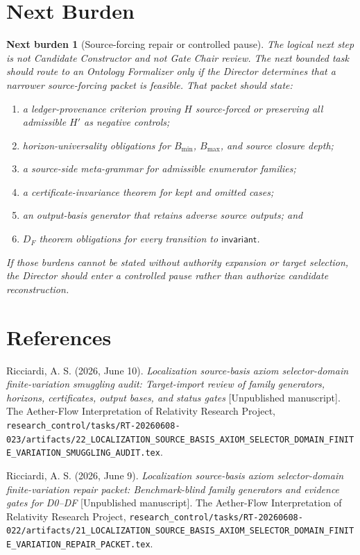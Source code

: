 \documentclass[11pt]{article}
\newtheorem{nextburden}{Next burden}
\begin{document}
\section{Next Burden}

\begin{nextburden}[Source-forcing repair or controlled pause]
The logical next step is not Candidate Constructor and not Gate Chair review.
The next bounded task should route to an Ontology Formalizer only if the
Director determines that a narrower source-forcing packet is feasible. That
packet should state:
\begin{enumerate}
    \item a ledger-provenance criterion proving \(H\) source-forced or
    preserving all admissible \(H'\) as negative controls;
    \item horizon-universality obligations for \(B_{\min}\), \(B_{\max}\),
    and source closure depth;
    \item a source-side meta-grammar for admissible enumerator families;
    \item a certificate-invariance theorem for kept and omitted cases;
    \item an output-basis generator that retains adverse source outputs; and
    \item \(D_F\) theorem obligations for every transition to
    \(\mathsf{invariant}\).
\end{enumerate}
If those burdens cannot be stated without authority expansion or target
selection, the Director should enter a controlled pause rather than
authorize candidate reconstruction.
\end{nextburden}

\section*{References}

Ricciardi, A. S. (2026, June 10). \emph{Localization source-basis axiom
selector-domain finite-variation smuggling audit: Target-import review of
family generators, horizons, certificates, output bases, and status gates}
[Unpublished manuscript]. The Aether-Flow Interpretation of Relativity
Research Project,
\texttt{research\_control/tasks/RT-20260608-023/artifacts/22\_LOCALIZATION\_SOURCE\_BASIS\_AXIOM\_SELECTOR\_DOMAIN\_FINITE\_VARIATION\_SMUGGLING\_AUDIT.tex}.

Ricciardi, A. S. (2026, June 9). \emph{Localization source-basis axiom
selector-domain finite-variation repair packet: Benchmark-blind family
generators and evidence gates for D0--DF} [Unpublished manuscript]. The
Aether-Flow Interpretation of Relativity Research Project,
\texttt{research\_control/tasks/RT-20260608-022/artifacts/21\_LOCALIZATION\_SOURCE\_BASIS\_AXIOM\_SELECTOR\_DOMAIN\_FINITE\_VARIATION\_REPAIR\_PACKET.tex}.
\end{document}
